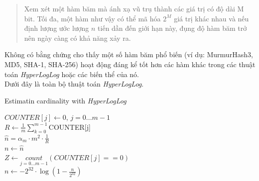 \documentclass[letterpaper,13pt]{article}
\theoremstyle{mytheor}
\begin{document}
\begin{quote}
    Xem xét một hàm băm mà ánh xạ vũ trụ thành các giá trị có độ dài M bit. Tối đa, một hàm như vậy có thể mã hóa $2^M$ 
    giá trị khác nhau và nếu định lượng ước lượng $n$ tiến dần đến giới hạn này, đụng độ hàm băm trở nên ngày càng có khả năng xảy ra.
    \vspace{0.25cm}
\end{quote}
\newpage
\indent Không có bằng chứng cho thấy một số hàm băm phổ biến (ví dụ: MurmurHash3, MD5, SHA-1, SHA-256) 
hoạt động đáng kể tốt hơn các hàm khác trong các thuật toán \textit{HyperLogLog} hoặc các biến thể của nó.\\

Dưới đây là toàn bộ thuật toán \textit{HyperLogLog}.\\

\begin{algorithm}[H]
    \vspace{0.25cm}
    \DontPrintSemicolon
    \LinesNumberedHidden
    \caption[]{Estimatin cardinality with \textit{HyperLogLog}}
    $COUNTER[j] \gets $0, $j = 0...m - 1$\\
    $R \gets \frac{1}{m} \sum\limits_{k=0}^{m-1}$COUNTER[j] \\
    $\hat{n} = \alpha_m \cdot m^2 \cdot \frac{1}{R}$ \\
    $n \gets \hat{n}$ \\
    {
        $Z \gets \underset{j=0...m-1}{count}\left(COUNTER[j] == 0\right)$\\
    }
    {
        $n \gets -2^{32}\cdot\log\left(1-\frac{n}{2^{32}}\right)$
    }
    \vspace{0.25cm}
\end{algorithm}
\vspace{0.25cm}
\end{document}
